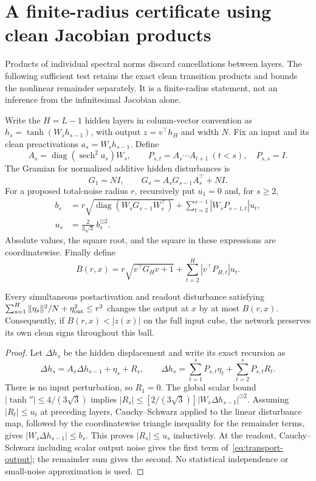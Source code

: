 \section{A finite-radius certificate using clean Jacobian products}
\label{sec:clean-transport-certificate}

Products of individual spectral norms discard cancellations between layers.
The following sufficient test retains the exact clean transition products and
bounds the nonlinear remainder separately. It is a finite-radius statement,
not an inference from the infinitesimal Jacobian alone.

Write the $H=L-1$ hidden layers in column-vector convention as
$h_s=\tanh(W_sh_{s-1})$, with output $z=v^\top h_H$ and width $N$.
Fix an input and its clean preactivations $a_s=W_sh_{s-1}$. Define
\[
 A_s=\operatorname{diag}(\operatorname{sech}^2 a_s)W_s,
 \qquad P_{s,t}=A_s\cdots A_{t+1}\ (t<s),\quad P_{s,s}=I.
\]
The Gramian for normalized additive hidden disturbances is
\[
 G_1=NI,\qquad G_s=A_sG_{s-1}A_s^\top+NI.
\]
For a proposed total-noise radius $r$, recursively put $u_1=0$ and, for $s\ge2$,
\begin{align}
 b_s&=r\sqrt{\operatorname{diag}(W_sG_{s-1}W_s^\top)}
       +\sum_{t=2}^{s-1}|W_sP_{s-1,t}|u_t,\label{eq:transport-b}\\
 u_s&=\frac{2}{3\sqrt3}\,b_s^{\odot2}.\label{eq:transport-u}
\end{align}
Absolute values, the square root, and the square in these expressions are
coordinatewise. Finally define
\begin{equation}\label{eq:transport-output}
 B(r,x)=r\sqrt{v^\top G_Hv+1}
                  +\sum_{t=2}^H|v^\top P_{H,t}|u_t.
\end{equation}

\begin{proposition}
Every simultaneous postactivation and readout disturbance satisfying
$\sum_{s=1}^H\|\eta_s\|^2/N+\eta_{\rm out}^2\le r^2$ changes the output
at $x$ by at most $B(r,x)$. Consequently, if $B(r,x)<|z(x)|$ on the full
input cube, the network preserves its own clean signs throughout this ball.
\end{proposition}
\begin{proof}
Let $\Delta h_s$ be the hidden displacement and write its exact recursion as
\[
 \Delta h_s=A_s\Delta h_{s-1}+\eta_s+R_s,
 \qquad
 \Delta h_s=\sum_{t=1}^sP_{s,t}\eta_t+\sum_{t=2}^sP_{s,t}R_t.
\]
There is no input perturbation, so $R_1=0$. The global scalar bound
$|\tanh''|\le4/(3\sqrt3)$ implies
$|R_s|\le[2/(3\sqrt3)]|W_s\Delta h_{s-1}|^{\odot2}$.
Assuming $|R_t|\le u_t$ at preceding layers, Cauchy--Schwarz applied to the
linear disturbance map, followed by the coordinatewise triangle inequality
for the remainder terms, gives $|W_s\Delta h_{s-1}|\le b_s$.
This proves $|R_s|\le u_s$ inductively. At the readout, Cauchy--Schwarz
including scalar output noise gives the first term of~\eqref{eq:transport-output};
the remainder sum gives the second. No statistical independence or
small-noise approximation is used.
\end{proof}

